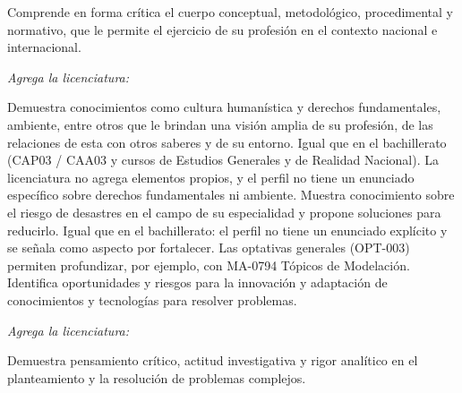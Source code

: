 \documentclass[11pt,a4paper]{article}
\begin{document}
{Comprende en forma crítica el cuerpo conceptual, metodológico, procedimental y normativo, que le permite el ejercicio de su profesión en el contexto nacional e internacional.}
{\textit{Agrega la licenciatura:}\par
 }
{Demuestra conocimientos como cultura humanística y derechos fundamentales, ambiente, entre otros que le brindan una visión amplia de su profesión, de las relaciones de esta con otros saberes y de su entorno.}
{Igual que en el bachillerato (CAP03 / CAA03 y cursos de Estudios Generales y de Realidad Nacional). La licenciatura no agrega elementos propios, y el perfil no tiene un enunciado específico sobre derechos fundamentales ni ambiente.}
{Muestra conocimiento sobre el riesgo de desastres en el campo de su especialidad y propone soluciones para reducirlo.}
{Igual que en el bachillerato: el perfil no tiene un enunciado explícito y se señala como aspecto por fortalecer. Las optativas generales (OPT-003) permiten profundizar, por ejemplo, con MA-0794 Tópicos de Modelación.}
{Identifica oportunidades y riesgos para la innovación y adaptación de conocimientos y tecnologías para resolver problemas.}
{\textit{Agrega la licenciatura:}\par
 }
{Demuestra pensamiento crítico, actitud investigativa y rigor analítico en el planteamiento y la resolución de problemas complejos.}
\end{document}
